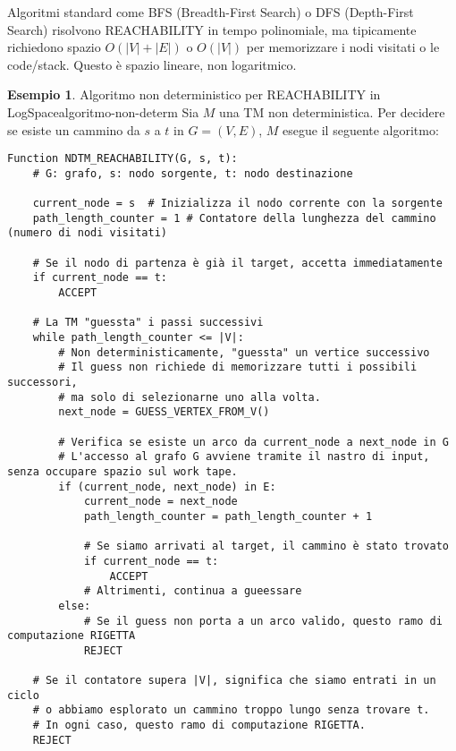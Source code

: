 \documentclass[a4paper]{article}
\theoremstyle{definition} %
\newtheorem{example}{Esempio}[section]
\begin{document}
Algoritmi standard come BFS (Breadth-First Search) o DFS (Depth-First Search) risolvono REACHABILITY in tempo polinomiale, ma tipicamente richiedono spazio $O(|V| + |E|)$ o $O(|V|)$ per memorizzare i nodi visitati o le code/stack. Questo è spazio lineare, non logaritmico.

\begin{example}{Algoritmo non deterministico per REACHABILITY in LogSpace}{algoritmo-non-determ}
Sia $M$ una TM non deterministica. Per decidere se esiste un cammino da $s$ a $t$ in $G=(V,E)$, $M$ esegue il seguente algoritmo:

\begin{verbatim}
Function NDTM_REACHABILITY(G, s, t):
    # G: grafo, s: nodo sorgente, t: nodo destinazione
    
    current_node = s  # Inizializza il nodo corrente con la sorgente
    path_length_counter = 1 # Contatore della lunghezza del cammino (numero di nodi visitati)
    
    # Se il nodo di partenza è già il target, accetta immediatamente
    if current_node == t:
        ACCEPT
        
    # La TM "guessta" i passi successivi
    while path_length_counter <= |V|:
        # Non deterministicamente, "guessta" un vertice successivo
        # Il guess non richiede di memorizzare tutti i possibili successori,
        # ma solo di selezionarne uno alla volta.
        next_node = GUESS_VERTEX_FROM_V() 
        
        # Verifica se esiste un arco da current_node a next_node in G
        # L'accesso al grafo G avviene tramite il nastro di input, senza occupare spazio sul work tape.
        if (current_node, next_node) in E:
            current_node = next_node
            path_length_counter = path_length_counter + 1
            
            # Se siamo arrivati al target, il cammino è stato trovato
            if current_node == t:
                ACCEPT
            # Altrimenti, continua a gueessare
        else:
            # Se il guess non porta a un arco valido, questo ramo di computazione RIGETTA
            REJECT
    
    # Se il contatore supera |V|, significa che siamo entrati in un ciclo
    # o abbiamo esplorato un cammino troppo lungo senza trovare t.
    # In ogni caso, questo ramo di computazione RIGETTA.
    REJECT
\end{verbatim}


\end{example}
\end{document}
